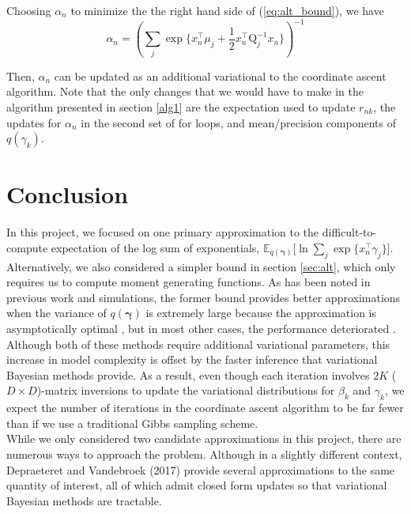 \documentclass[twoside,11pt]{article}
\newcommand{\tr}{\intercal}
\newcommand{\transpose}[1]{#1^{\intercal}}
\newcommand{\boldgamma}{\boldsymbol\gamma}
\newcommand{\E}{\mathbb{E}}
\begin{document}
Choosing $\alpha_n$ to minimize the the right hand side of (\ref{eq:alt_bound}), we have
$$\alpha_n = \left( \sum_{j} \exp\Big\{ \transpose{x_n} \mu_j + \frac{1}{2} \transpose{x_n}\mathrm{Q}_j^{-1} x_n \Big\} \right)^{-1}$$

Then, $\alpha_n$ can be updated as an additional variational to the coordinate ascent algorithm. Note that the only changes that we would have to make in the algorithm presented in section \ref{alg1} are the expectation used to update $r_{nk}$, the updates for $\alpha_n$ in the second set of for loops, and mean/precision components of $q(\gamma_k)$. 



\section{Conclusion}
In this project, we focused on one primary approximation to the difficult-to-compute expectation of the log sum of exponentials, $\E_{q(\boldsymbol\gamma)}\big[\ln \sum_{j} \exp \{ x_n^{\tr} \gamma_j \} \big]$. 
Alternatively, we also considered a simpler bound in section \ref{sec:alt}, which only requires us to compute moment generating functions. As has been noted in previous work and simulations, the former bound provides better approximations when the variance of $q(\boldgamma)$ is extremely large because the approximation is asymptotically optimal \parencite{bouchard:07}, but in most other cases, the performance deteriorated \parencite{Depraetere:17}. Although both of these methods require additional variational parameters, this increase in model complexity is offset by the faster inference that variational Bayesian methods provide. As a result, even though each iteration involves $2K$ ($D \times D$)-matrix inversions to update the variational distributions for $\beta_k$ and $\gamma_k$, we expect the number of iterations in the coordinate ascent algorithm to be far fewer than if we use a traditional Gibbs sampling scheme. \\

While we only considered two candidate approximations in this project, there are numerous ways to approach the problem. Although in a slightly different context, Depraeteret and Vandebroek (2017) provide several approximations to the same quantity of interest, all of which admit closed form updates so that variational Bayesian methods are tractable. 


\end{document}
